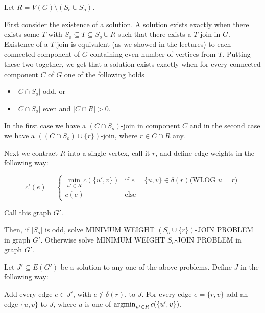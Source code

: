 \begin{exercise}{3}
    Let $R = V(G) \setminus (S_e \cup S_o)$.

    First consider the existence of a solution. A solution exists exactly when
    there exists some $T$ with $S_o \subseteq T \subseteq S_o \cup R$ such that
    there exists a $T$-join in $G$. Existence of a $T$-join is equivalent (as we
    showed in the lectures) to each connected component of $G$ containing even
    number of vertices from $T$. Putting these two together, we get that a
    solution exists exactly when for every connected component $C$ of $G$ one of
    the following holds
    \begin{itemize}
        \item{$|C \cap S_o|$ odd, or}
        \item{$|C \cap S_o|$ even and $|C \cap R| > 0$.}
    \end{itemize}
    In the first case we have a $(C \cap S_o)$-join in component $C$ and in the
    second case we have a $((C \cap S_o) \cup \{r\})$-join, where $r \in C \cap
    R$ any.

    Next we contract $R$ into a single vertex, call it $r$, and define edge weights in the
    following way:

    \[
        c'(e) = \begin{cases}
            \min_{u' \in R} c(\{u', v\})  & \text{if $e = \{u, v\} \in \delta(r)$
            (WLOG $u = r$)} \\
            c(e) & \text{else}
        \end{cases}
    \]

    Call this graph $G'$.

    Then, if $|S_o|$ is odd, solve MINIMUM WEIGHT $(S_o \cup \{r\})$-JOIN
    PROBLEM in graph $G'$. Otherwise solve MINIMUM WEIGHT $S_o$-JOIN PROBLEM in
    graph $G'$.

    Let $J' \subseteq E(G')$ be a solution to any one of the above problems.
    Define $J$ in the following way:

    Add every edge $e \in J'$, with $e \notin \delta(r)$, to $J$. For every edge
    $e = \{r, v\}$ add an edge $\{u, v\}$ to $J$, where $u$ is one of
    $\operatorname{argmin}_{u' \in R} c(\{u', v\})$.


\end{exercise}


